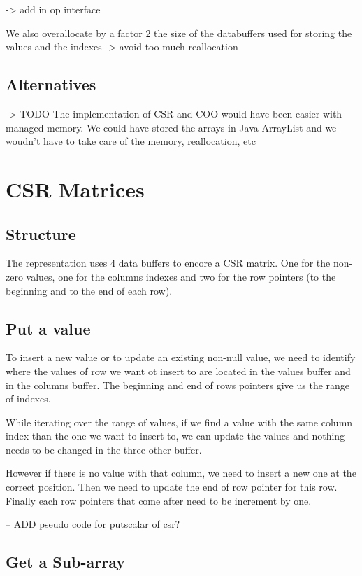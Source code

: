 -> add in op interface

We also overallocate by a factor 2 the size of the databuffers used for storing the values and the indexes -> avoid too much reallocation

\subsection{Alternatives}
-> TODO %
The implementation of CSR and COO would have been easier with managed memory. We could have stored the arrays in Java ArrayList and we woudn't have to take care of the memory, reallocation, etc 


\section{CSR Matrices}
\subsection{Structure}

The representation uses 4 data buffers to encore a CSR matrix. One for the non-zero values, one for the columns indexes and two for the row pointers (to the beginning and to the end of each row).

\subsection{Put a value}

To insert a new value or to update an existing non-null value, we need to identify where the values of row we want ot insert to are located in the values buffer and in the columns buffer. The beginning and end of rows pointers give us the range of indexes.

While iterating over the range of values, if we find a value with the same column index than the one we want to insert to, we can update the values and nothing needs to be changed in the three other buffer. 

However if there is no value with that column, we need to insert a new one at the correct position. Then we need to update the end of row pointer for this row. Finally each row pointers that come after need to be increment by one.

-- ADD pseudo code for putscalar of csr?



\subsection{Get a Sub-array}

